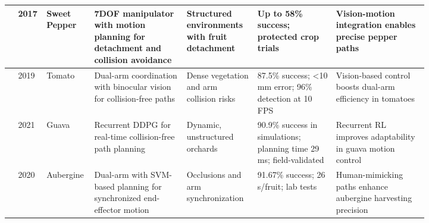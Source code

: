\documentclass[a4paper,fleqn]{cas-dc}
\begin{document}
\begin{table}[htbp]
\begin{tabular}{p{0.025\linewidth} p{0.025\linewidth} p{0.055\linewidth} p{0.2\linewidth} p{0.135\linewidth} p{0.175\linewidth} p{0.2\linewidth}}
\cite{lehnert2017autonomous} & 2017 & Sweet Pepper & 7DOF manipulator with motion planning for detachment and collision avoidance & Structured environments with fruit detachment & Up to 58\% success; protected crop trials & Vision-motion integration enables precise pepper paths \\ \midrule
\cite{ling2019dual} & 2019 & Tomato & Dual-arm coordination with binocular vision for collision-free paths & Dense vegetation and arm collision risks & 87.5\% success; <10 mm error; 96\% detection at 10 FPS & Vision-based control boosts dual-arm efficiency in tomatoes \\ \midrule
\cite{lin2021collision} & 2021 & Guava & Recurrent DDPG for real-time collision-free path planning & Dynamic, unstructured orchards & 90.9\% success in simulations; planning time 29 ms; field-validated & Recurrent RL improves adaptability in guava motion control \\ \midrule
\cite{sepulveda2020robotic} & 2020 & Aubergine & Dual-arm with SVM-based planning for synchronized end-effector motion & Occlusions and arm synchronization & 91.67\% success; 26 s/fruit; lab tests & Human-mimicking paths enhance aubergine harvesting precision \\ \midrule


\end{tabular}
\end{table}
\end{document}
